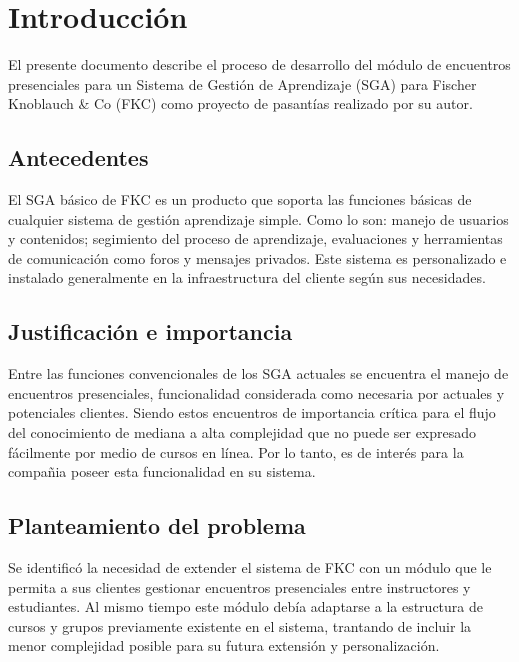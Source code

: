 \chapter*{Introducción}
\thispagestyle{empty} %
 
El presente documento describe el proceso de desarrollo del módulo de encuentros presenciales para un Sistema de Gestión de Aprendizaje (SGA) para Fischer Knoblauch \& Co (FKC) como proyecto de pasantías realizado por su autor.

\section*{Antecedentes}
El SGA básico de FKC es un producto que soporta las funciones básicas de cualquier sistema de gestión aprendizaje simple. Como lo son: manejo de usuarios y contenidos; segimiento del proceso de aprendizaje, evaluaciones y herramientas de comunicación como foros y mensajes privados. Este sistema es personalizado e instalado generalmente en la infraestructura del cliente según sus necesidades.

\section*{Justificación e importancia}
Entre las funciones convencionales de los SGA actuales se encuentra el manejo de encuentros presenciales, funcionalidad considerada como necesaria por actuales y potenciales clientes. Siendo estos encuentros de importancia crítica para el flujo del conocimiento de mediana a alta complejidad que no puede ser expresado fácilmente por medio de cursos en línea. Por lo tanto, es de interés para la compañia poseer esta funcionalidad en su sistema.


\section*{Planteamiento del problema}
Se identificó la necesidad de extender el sistema de FKC con un módulo que le permita a sus clientes gestionar encuentros presenciales entre instructores y estudiantes. Al mismo tiempo este módulo debía adaptarse a la estructura de cursos y grupos previamente existente en el sistema, trantando de incluir la menor complejidad posible para su futura extensión y personalización.

